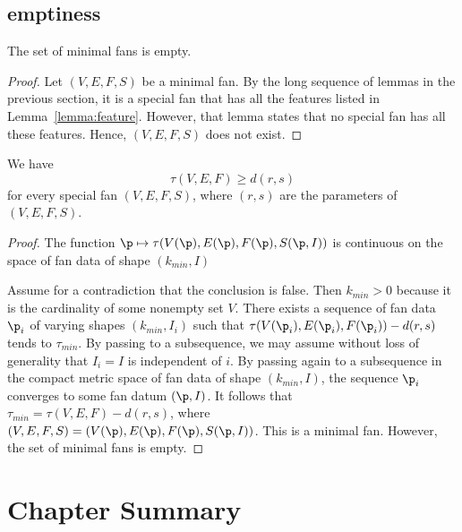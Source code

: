 \subsection{emptiness}


\begin{lemma}[emptiness]\label{lemma:min-empty}  
The set of minimal fans is empty.
\end{lemma}

\begin{proof} Let $(V,E,F,S)$ be a minimal fan.  By the long sequence
  of lemmas in the previous section, it is a special fan that has all
  the features listed in Lemma~\ref{lemma:feature}.  However, that
  lemma states that no special fan has all these features.  Hence,
  $(V,E,F,S)$ does not exist.
\end{proof}

\begin{lemma}
\label{lemma:empty-d}
We have
\[ 
\tau(V,E,F) \ge d (r,s)
\] 
for every special fan $(V,E,F,S)$, where $(r,s)$ are the parameters of
$(V,E,F,S)$.
\end{lemma}

\begin{proof} 
The function $\p\mapsto \tau(V(\p),E(\p),F(\p),S(\p,I))$ is
continuous on the space of fan data of shape $(k_{min},I)$

Assume for a contradiction that the conclusion is false.  Then
$k_{min}>0$ because it is the cardinality of some nonempty set $V$.
There exists a sequence of fan data $\p_i$ of varying shapes
$(k_{min},I_i)$ such that $\tau(V(\p_i),E(\p_i),F(\p_i))-d(r,s)$ tends
to $\tau_{min}$.  By passing to a subsequence, we may assume without
loss of generality that $I_i = I$ is independent of $i$.  By passing
again to a subsequence in the compact metric space of fan data of
shape $(k_{min},I)$, the sequence $\p_i$ converges to some fan datum
$(\p,I)$.  It follows that $\tau_{min} = \tau(V,E,F)-d(r,s)$, where
$(V,E,F,S)=(V(\p),E(\p),F(\p),S(\p,I))$.  This is a minimal fan.
However, the set of minimal fans is empty.
\end{proof}



\section{Chapter Summary}


